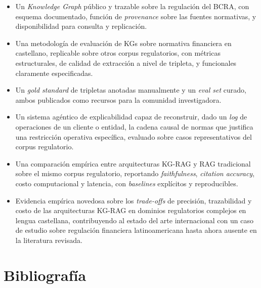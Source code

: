 \documentclass[12pt,a4paper]{article}
\begin{document}
\begin{itemize}
    \item Un \textit{Knowledge Graph} público y trazable sobre la regulación del BCRA, con esquema documentado, función de \textit{provenance} sobre las fuentes normativas, y disponibilidad para consulta y replicación.
    \item Una metodología de evaluación de KGs sobre normativa financiera en castellano, replicable sobre otros corpus regulatorios, con métricas estructurales, de calidad de extracción a nivel de tripleta, y funcionales claramente especificadas.
    \item Un \textit{gold standard} de tripletas anotadas manualmente y un \textit{eval set} curado, ambos publicados como recursos para la comunidad investigadora.
    \item Un sistema agéntico de explicabilidad capaz de reconstruir, dado un \textit{log} de operaciones de un cliente o entidad, la cadena causal de normas que justifica una restricción operativa específica, evaluado sobre casos representativos del corpus regulatorio.
    \item Una comparación empírica entre arquitecturas KG-RAG y RAG tradicional sobre el mismo corpus regulatorio, reportando \textit{faithfulness}, \textit{citation accuracy}, costo computacional y latencia, con \textit{baselines} explícitos y reproducibles.
    \item Evidencia empírica novedosa sobre los \textit{trade-offs} de precisión, trazabilidad y costo de las arquitecturas KG-RAG en dominios regulatorios complejos en lengua castellana, contribuyendo al estado del arte internacional con un caso de estudio sobre regulación financiera latinoamericana hasta ahora ausente en la literatura revisada.
\end{itemize}


\section{Bibliografía}
\printbibliography[heading=none]
\end{document}
